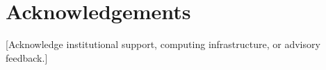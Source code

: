 \documentclass[a4paper,fleqn]{cas-sc}
\begin{document}
\section*{Acknowledgements}
[Acknowledge institutional support, computing infrastructure, or advisory feedback.]



\end{document}
